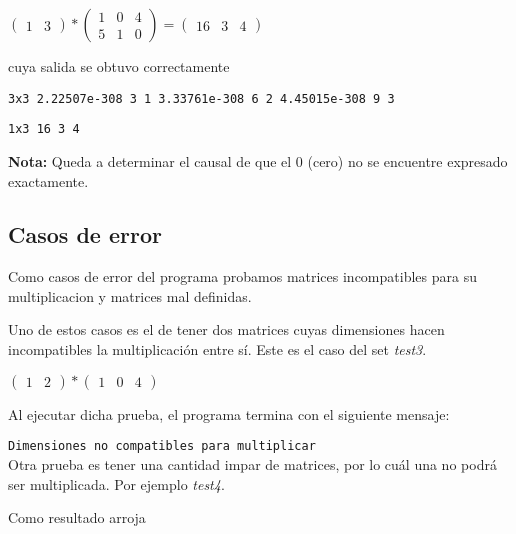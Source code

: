 \documentclass[10pt,a4paper]{article}
\begin{document}
		\begin{center}
		$\begin{pmatrix}
		1 & 3
		\end{pmatrix}
		*
		\begin{pmatrix}
		1 & 0 & 4 \\ 5 & 1 & 0
		\end{pmatrix}
		=
		\begin{pmatrix}
		16 & 3 & 4
		\end{pmatrix}
		$\end{center}
	
		cuya salida se obtuvo correctamente
	
		\texttt{3x3 2.22507e-308 3 1 3.33761e-308 6 2 4.45015e-308 9 3 }

		\texttt{1x3 16 3 4}

		\textbf{Nota:} Queda a determinar el causal de que el 0 (cero) no se encuentre expresado exactamente.

	\subsection{Casos de error}
		Como casos de error del programa probamos matrices incompatibles para su multiplicacion y matrices mal definidas.

		Uno de estos casos es el de tener dos matrices cuyas dimensiones hacen incompatibles la multiplicación entre sí. Este es el caso del set \textit{test3}.

		
		\begin{center}
		$\begin{pmatrix}
		1 & 2
		\end{pmatrix}
		*
		\begin{pmatrix}
		1 & 0 & 4
		\end{pmatrix}
		$\end{center}

		Al ejecutar dicha prueba, el programa termina con el siguiente mensaje:

		\texttt{Dimensiones no compatibles para multiplicar}\\

		Otra prueba es tener una cantidad impar de matrices, por lo cuál una no podrá ser multiplicada. Por ejemplo \textit{test4}.

		
		
		Como resultado arroja
\end{document}
